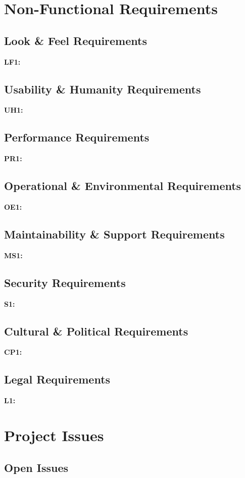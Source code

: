 \documentclass[titlepage]{article}
\begin{document}
\section{Non-Functional Requirements}
\subsection{Look \& Feel Requirements}
\textbf{LF1:} %

\subsection{Usability \& Humanity Requirements}
\textbf{UH1:} %

\subsection{Performance Requirements}
\textbf{PR1:} %

\subsection{Operational \& Environmental Requirements}
\textbf{OE1:} %

\subsection{Maintainability \& Support Requirements}
\textbf{MS1:} %

\subsection{Security Requirements}
\textbf{S1:} %

\subsection{Cultural \& Political Requirements}
\textbf{CP1:} %

\subsection{Legal Requirements}
\textbf{L1:} %


\section{Project Issues}
\subsection{Open Issues}
\end{document}
